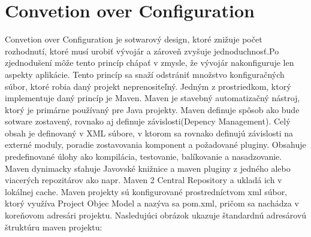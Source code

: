 \section{Convetion over Configuration}
Convetion over Configuration je sotwarový design, ktoré znižuje počet rozhodnutí, ktoré musí urobiť vývojár a zároveň zvyšuje jednoduchnosť.Po zjednodušení môže tento princíp chápať v zmysle, že vývojár nakonfiguruje len  aspekty aplikácie. Tento princíp sa snaží odstrániť množstvo konfiguračných súbor, ktoré robia daný projekt neprenositeľný.
Jedným z prostriedkom, ktorý implementuje daný princíp je Maven. Maven je stavebný automatizačný nástroj, ktorý je primárne používaný pre Java projekty. Maven definuje spôsob ako bude sotware zostavený, rovnako aj definuje závislosti(Depency Management). Celý obsah je definovaný v XML súbore, v ktorom sa rovnako definujú závislosti na externé moduly, poradie zostavovania komponent a požadované pluginy. Obsahuje predefinované úlohy ako kompilácia, testovanie, balíkovanie a nasadzovanie. Maven dynimacky sťahuje Javovské knižnice a maven pluginy z jedného alebo viacerých repozitárov ako napr. Maven 2 Central Repository a ukladá ich v lokálnej cache. Maven projekty sú konfigurované prostredníctvom xml súbor, ktorý využíva Project Objec Model a nazýva sa pom.xml, pričom sa nachádza v koreňovom adresári projektu. Nasledujúci obrázok ukazuje štandardnú adresárovú štruktúru maven projektu:

